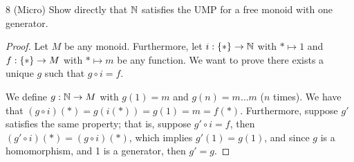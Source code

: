\begin{exercise}{8 (Micro)}
Show directly that $\mathbb{N}$ satisfies the UMP for a free monoid with one generator.
\end{exercise}
\begin{proof}
Let $M$ be any monoid.
Furthermore, let $i : \{\ast\} \to \mathbb{N}$ with $\ast \mapsto 1$ and $f : \{\ast\} \to M$ with $\ast \mapsto m$ be any function.
We want to prove there exists a unique $g$ such that $g \circ i = f$.

We define $g: \mathbb{N} \to M$ with $g(1) = m$ and $g(n) = m \dots m$ ($n$ times).
We have that $(g \circ i)(\ast) = g(i(\ast)) = g(1) = m = f(\ast)$.
Furthermore, suppose $g'$ satisfies the same property;
that is, suppose $g' \circ i = f$, then $(g' \circ i)(\ast) = (g \circ i)(\ast)$, which implies $g'(1) = g(1)$, and since $g$ is a homomorphism, and 1 is a generator, then $g' = g$.
\end{proof} 

